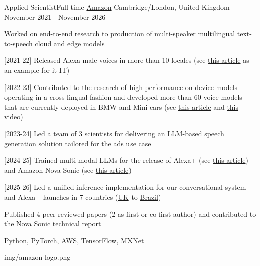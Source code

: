 
\begin{cventries}

  \logocventry
    {Applied Scientist{\enskip\cdotp\enskip}Full-time}
    {\href{https://www.amazon.com/}{Amazon}}
    {Cambridge/London, United Kingdom}
    {November 2021 - November 2026}
    {
      \begin{cvitems}
        \item {Worked on end-to-end research to production of multi-speaker multilingual text-to-speech cloud and edge models}
        \item {[2021-22] Released Alexa male voices in more than 10 locales (see \textcolor{blue}{\href{https://www.hdblog.it/casa/articoli/n562569/alexa-cambia-voce-maschile-femminile-come-fare/}{this article}} as an example for it-IT)}
        \item {[2022-23] Contributed to the research of high-performance on-device models operating in a cross-lingual fashion and developed more than 60 voice models that are currently deployed in BMW and Mini cars (see \textcolor{blue}{\href{https://www.aboutamazon.com/news/devices/amazon-bmw}{this article}} and \textcolor{blue}{\href{https://www.youtube.com/watch?v=qVOHZ-PsNXw}{this video}})}
        \item {[2023-24] Led a team of 3 scientists for delivering an LLM-based speech generation solution tailored for the ads use case}
        \item {[2024-25] Trained multi-modal LLMs for the release of Alexa+ (see \textcolor{blue}{\href{https://www.aboutamazon.com/news/devices/new-alexa-generative-artificial-intelligence}{this article}}) and Amazon Nova Sonic (see \textcolor{blue}{\href{https://www.aboutamazon.com/news/innovation-at-amazon/nova-sonic-voice-speech-foundation-model}{this article}})}
        \item {[2025-26] Led a unified inference implementation for our conversational system and Alexa+ launches in 7 countries (\textcolor{blue}{\href{https://www.aboutamazon.co.uk/news/devices/introducing-alexa-in-the-uk-the-next-generation-of-alexa}{UK}} to \textcolor{blue}{\href{https://www.aboutamazon.com.br/noticias/dispositivos/alexa-chega-ao-brasil-a-assistente-de-ia-de-ultima-geracao-da-amazon}{Brazil}})}
        \item {Published 4 peer-reviewed papers (2 as first or co-first author) and contributed to the Nova Sonic technical report}
      \end{cvitems}
      \cvexptech
        {Python, PyTorch, AWS, TensorFlow, MXNet}
    }
    {img/amazon-logo.png}


\end{cventries}
